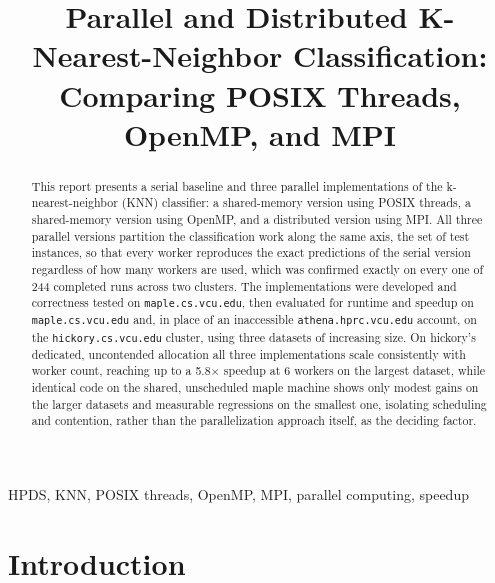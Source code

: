 \documentclass[conference]{IEEEtran}
\begin{document}
\title{Parallel and Distributed K-Nearest-Neighbor Classification: Comparing POSIX Threads, OpenMP, and MPI}

\author{
}

\maketitle

\begin{abstract}
This report presents a serial baseline and three parallel implementations
of the k-nearest-neighbor (KNN) classifier: a shared-memory version using
POSIX threads, a shared-memory version using OpenMP, and a distributed
version using MPI. All three parallel versions partition the classification
work along the same axis, the set of test instances, so that every worker
reproduces the exact predictions of the serial version regardless of how
many workers are used, which was confirmed exactly on every one of 244
completed runs across two clusters. The implementations were developed and
correctness tested on \texttt{maple.cs.vcu.edu}, then evaluated for runtime
and speedup on \texttt{maple.cs.vcu.edu} and, in place of an inaccessible
\texttt{athena.hprc.vcu.edu} account, on the \texttt{hickory.cs.vcu.edu}
cluster, using three datasets of increasing size. On hickory's dedicated,
uncontended allocation all three implementations scale consistently with
worker count, reaching up to a 5.8$\times$ speedup at 6 workers on the
largest dataset, while identical code on the shared, unscheduled maple
machine shows only modest gains on the larger datasets and measurable
regressions on the smallest one, isolating scheduling and contention,
rather than the parallelization approach itself, as the deciding factor.
\end{abstract}

\begin{IEEEkeywords}
HPDS, KNN, POSIX threads, OpenMP, MPI, parallel computing, speedup
\end{IEEEkeywords}

\section{Introduction}
\end{document}
